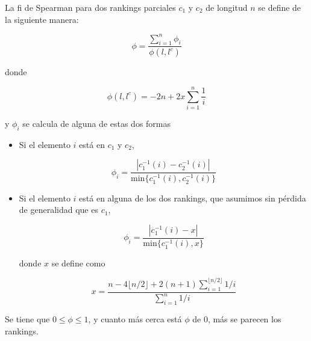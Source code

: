 \begin{defi}
La fi de Spearman para dos rankings parciales $c_1$ y $c_2$ de longitud $n$ se define de la siguiente manera:

\begin{equation}
\phi = \dfrac{\sum\limits_{i=1}^{n} \phi_i}{\phi(l, l^c)}
\end{equation} 

donde 

\begin{equation}
\phi(l, l^c) = -2n + 2x\sum\limits_{i=1}^{n} \dfrac{1}{i}
\end{equation}

y $\phi_i$ se calcula de alguna de estas dos formas

\begin{itemize}
\item Si el elemento $i$ está en $c_1$ y $c_2$,

\begin{equation}
\phi_i = \dfrac{|c_1^{-1}(i) - c_2^{-1}(i)|}{\mathrm{min}\{c_1^{-1}(i), c_2^{-1}(i)\}}
\end{equation}

\item Si el elemento $i$ está en alguna de los dos rankings, que asumimos sin pérdida de generalidad que es $c_1$,


\begin{equation}
\phi_i = \dfrac{|c_1^{-1}(i) - x|}{\mathrm{min}\{c_1^{-1}(i), x\}}
\end{equation} 

donde $x$ se define como

\begin{equation}
x = \dfrac{n - 4 \lfloor n/2\rfloor + 2(n+1) \sum_{i=1}^{\lfloor n/2\rfloor} 1/i}{\sum_{i=1}^{n} 1/i}
\end{equation}
\end{itemize}
\end{defi}

Se tiene que $0 \leq \phi \leq 1$, y cuanto más cerca está $\phi$ de $0$, más se parecen los rankings.


